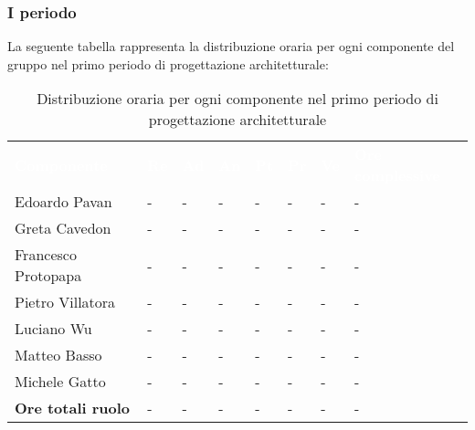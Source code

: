 \subsubsection{I periodo}
La seguente tabella rappresenta la distribuzione oraria per ogni componente del gruppo nel primo periodo di progettazione architetturale:
\begin{table}[!htbp]
\begin{center}
\renewcommand{\arraystretch}{1.25}
\begin{tabular}{ m{}<{\centering}  m{}<{\centering} m{}<{\centering} m{}<{\centering}  m{}<{\centering}  m{}<{\centering}  m{}<{\centering}  m{}<{\centering}   }
	\rowcolor{darkblue}
	\textcolor{white}{\textbf{Componente}} &\textcolor{white}{\textbf{Re}}&\textcolor{white}{\textbf{Ad}}&\textcolor{white}{\textbf{An}}&\textcolor{white}{\textbf{Pt}}&\textcolor{white}{\textbf{Pr}}&\textcolor{white}{\textbf{Ve}}&\textcolor{white}{\textbf{Ore complessive}}\\ 

	Edoardo Pavan & - & - & - & - & - & - & -\\	

	\rowcolor{gray!10} Greta Cavedon & - & - & - & - & - & - & -\\
	
	Francesco Protopapa & - & - & - & - & - & - & -\\
	
	\rowcolor{gray!10} Pietro Villatora & - & - & - & - & - & - & -\\
	
	Luciano Wu & - & - & - & - & - & - & -\\
	
	\rowcolor{gray!10} Matteo Basso & - & - & - & - & - & - & -\\
	
	Michele Gatto & - & - & - & - & - & - & -\\
	
	\rowcolor{gray!10} \textbf{Ore totali ruolo} & - & - & - & - & - & - & -\\

\end{tabular}
\caption{Distribuzione oraria per ogni componente nel primo periodo di progettazione architetturale}
\end{center}
\end{table}

